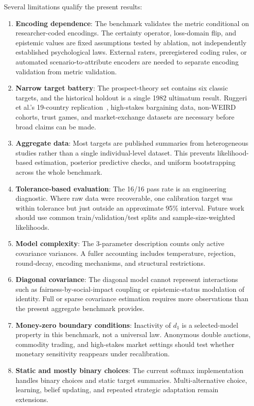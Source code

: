 \documentclass[journal]{IEEEtran}
\begin{document}
Several limitations qualify the present results:
\begin{enumerate}
    \item \textbf{Encoding dependence}: The benchmark validates the metric conditional on researcher-coded encodings. The certainty operator, loss-domain flip, and epistemic values are fixed assumptions tested by ablation, not independently established psychological laws. External raters, preregistered coding rules, or automated scenario-to-attribute encoders are needed to separate encoding validation from metric validation.
    \item \textbf{Narrow target battery}: The prospect-theory set contains six classic targets, and the historical holdout is a single 1982 ultimatum result. Ruggeri et al.'s 19-country replication~\cite{ruggeri2020}, high-stakes bargaining data, non-WEIRD cohorts, trust games, and market-exchange datasets are necessary before broad claims can be made.
    \item \textbf{Aggregate data}: Most targets are published summaries from heterogeneous studies rather than a single individual-level dataset. This prevents likelihood-based estimation, posterior predictive checks, and uniform bootstrapping across the whole benchmark.
    \item \textbf{Tolerance-based evaluation}: The 16/16 pass rate is an engineering diagnostic. Where raw data were recoverable, one calibration target was within tolerance but just outside an approximate 95\% interval. Future work should use common train/validation/test splits and sample-size-weighted likelihoods.
    \item \textbf{Model complexity}: The 3-parameter description counts only active covariance variances. A fuller accounting includes temperature, rejection, round-decay, encoding mechanisms, and structural restrictions.
    \item \textbf{Diagonal covariance}: The diagonal model cannot represent interactions such as fairness-by-social-impact coupling or epistemic-status modulation of identity. Full or sparse covariance estimation requires more observations than the present aggregate benchmark provides.
    \item \textbf{Money-zero boundary conditions}: Inactivity of $d_1$ is a selected-model property in this benchmark, not a universal law. Anonymous double auctions, commodity trading, and high-stakes market settings should test whether monetary sensitivity reappears under recalibration.
    \item \textbf{Static and mostly binary choices}: The current softmax implementation handles binary choices and static target summaries. Multi-alternative choice, learning, belief updating, and repeated strategic adaptation remain extensions.
\end{enumerate}
\end{document}
